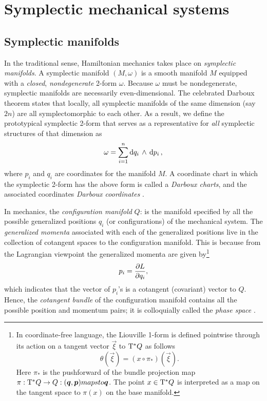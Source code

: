 \section{Symplectic mechanical systems}
\label{sec:symplectic}

\subsection{Symplectic manifolds}
In the traditional sense, Hamiltonian mechanics takes place on \emph{symplectic manifolds}. A symplectic manifold $(M, \omega)$ is a smooth manifold $M$ equipped with a \emph{closed}, \emph{nondegenerate} 2-form $\omega$. Because $\omega$ must be nondegenerate, symplectic manifolds are necessarily even-dimensional. The celebrated Darboux theorem states that locally, all symplectic manifolds of the same dimension (say $2n$) are all symplectomorphic to each other. As a result, we define the prototypical symplectic 2-form that serves as a representative for \emph{all} symplectic structures of that dimension as
\begin{equation}
    \omega = \sum_{i = 1}^n  \dd{q_i}\,\wedge\,\dd{p_i} ,
    \label{eq:darboux_symplectic_form}
\end{equation}
where $p_i$ and $q_i$ are coordinates for the manifold $M$. A coordinate chart in which the symplectic 2-form has the above form is called a \emph{Darboux charts}, and the associated coordinates \emph{Darboux coordinates} \cite{Cannas2001, Arnold1989}.

In mechanics, the \emph{configuration manifold} $Q$: is the manifold specified by all the possible generalized positions $q_i$ (or configurations) of the mechanical system. The \emph{generalized momenta} associated with each of the generalized positions live in the collection of cotangent spaces to the configuration manifold. This is because from the Lagrangian viewpoint the generalized momenta are given by\footnote
{
    In coordinate-free language, the Liouville 1-form is defined pointwise through its action on a tangent vector $\vec{\xi}$ to $\mathrm{T}^*Q$ as follows
    $$ \theta(\vec{\xi}) = (x \circ \pi_*) (\vec{\xi}). $$
    Here $\pi_*$ is the pushforward of the bundle projection map $\pi: \ctbundle{Q} \to Q: (\vec{q}, \vec{p}) mapsto \vec{q}$. The point $x \in \mathrm{T}^*Q$ is interpreted as a map on the tangent space to $\pi(x)$ on the base manifold.
}
$$ p_i = \pdv{L}{q_i}, $$
which indicates that the vector of $p_i$'s is a cotangent (covariant) vector to $Q$. Hence, the \emph{cotangent bundle} of the configuration manifold contains all the possible position and momentum pairs; it is colloquially called the \emph{phase space} \cite{Abraham1978,Arnold1989,Libermann1987}.

